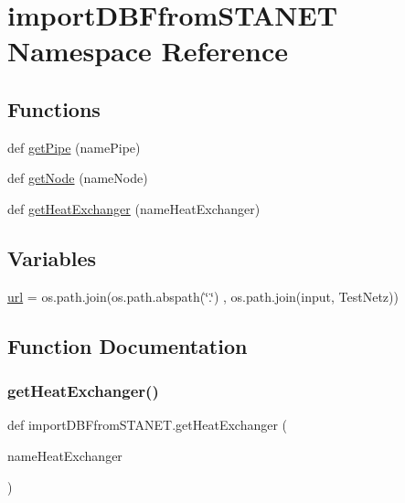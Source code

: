 \hypertarget{namespaceimport_d_b_ffrom_s_t_a_n_e_t}{}\section{import\+D\+B\+Ffrom\+S\+T\+A\+N\+ET Namespace Reference}
\label{namespaceimport_d_b_ffrom_s_t_a_n_e_t}
\subsection*{Functions}
\begin{DoxyCompactItemize}
\item 
def \hyperlink{namespaceimport_d_b_ffrom_s_t_a_n_e_t_a3baf717d83d4d6a45a03b13d4b01004c}{get\+Pipe} (name\+Pipe)
\item 
def \hyperlink{namespaceimport_d_b_ffrom_s_t_a_n_e_t_ad03c3058a85f1503b478dc90c3c3731c}{get\+Node} (name\+Node)
\item 
def \hyperlink{namespaceimport_d_b_ffrom_s_t_a_n_e_t_a0ba7b71809f0a165bb8c2dd53cec2c3d}{get\+Heat\+Exchanger} (name\+Heat\+Exchanger)
\end{DoxyCompactItemize}
\subsection*{Variables}
\begin{DoxyCompactItemize}
\item 
\hyperlink{namespaceimport_d_b_ffrom_s_t_a_n_e_t_add9cff8b414879d1bc29603a2a829364}{url} = os.\+path.\+join(os.\+path.\+abspath(\char`\"{}.\char`\"{}) , os.\+path.\+join(\textquotesingle{}input\textquotesingle{}, \textquotesingle{}Test\+Netz\textquotesingle{}))
\end{DoxyCompactItemize}


\subsection{Function Documentation}
\mbox{\label{namespaceimport_d_b_ffrom_s_t_a_n_e_t_a0ba7b71809f0a165bb8c2dd53cec2c3d}} 
\subsubsection{\texorpdfstring{get\+Heat\+Exchanger()}{getHeatExchanger()}}
{\footnotesize\ttfamily def import\+D\+B\+Ffrom\+S\+T\+A\+N\+E\+T.\+get\+Heat\+Exchanger (\begin{DoxyParamCaption}\item[{}]{name\+Heat\+Exchanger }\end{DoxyParamCaption})}



